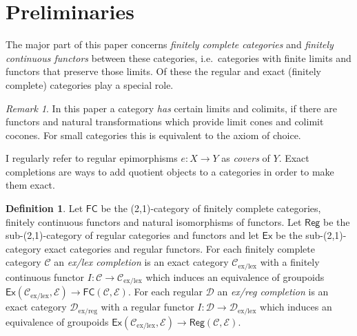 \documentclass[sort&compress]{elsarticle}
\theoremstyle{plain}
\theoremstyle{definition}
\newtheorem{defin}[theorem]{Definition}
\theoremstyle{remark}
\newtheorem{remark}[theorem]{Remark}
\newcommand\hide[1]{}
\newcommand\cat\mathcal
\newcommand\exlex{_\mathrm{ex/lex}}
\newcommand\exreg{_\mathrm{ex/reg}}
\begin{document}
\hide{%
\hide{Hyland, Pitts, Frey}
My paper stays within the sandbox of finitely complete categories, but exact completions are defined for categories which are finitely complete in a weakened sense . Moreover, Michael Shulman shows that both the ex/lex and the ex/reg completion are special cases of the exact completion of a \emph{unary site} in \citet{ECnSS}, which in turn is a member of a family of colimit completion construction for sites which includes the topos of sheaves. There is much to explore here concerning completions which are toposes.

Finally, the ex/lex completion of a category has some parallels to the construction of the category of Kan complexes in the same category. In this analogy the generic monomorphism is a generic small Kan fibration. Interesting \emph{$\infty$-toposes} and other models of \emph{homotopy type theory} may arise this way.
}

\section{Preliminaries} %
The major part of this paper concerns \emph{finitely complete categories} and \emph{finitely continuous functors} between these categories, i.e.\ categories with finite limits and functors that preserve those limits. Of these the regular and exact (finitely complete) categories play a special role.

\begin{remark} In this paper a category \emph{has} certain limits and colimits, if there are functors and natural transformations which provide limit cones and colimit cocones. For small categories this is equivalent to the axiom of choice. \end{remark}

I regularly refer to regular epimorphisms $e:X\to Y$ as \emph{covers} of $Y$.
Exact completions are ways to add quotient objects to a categories in order to make them exact.

\newcommand\FC{\mathsf{FC}}
\newcommand\Reg{\mathsf{Reg}}
\newcommand\Ex{\mathsf{Ex}}
\begin{defin}
Let $\FC$ be the (2,1)-category of finitely complete categories, finitely continuous functors and natural isomorphisms of functors. Let $\Reg$ be the sub-(2,1)-category of regular categories and functors and let $\Ex$ be the sub-(2,1)-category exact categories and regular functors. For each finitely complete category $\cat C$ an \emph{ex/lex completion} is an exact category $\cat C\exlex$ with a finitely continuous functor $I:\cat C \to \cat C\exlex$ which induces an equivalence of groupoids $\Ex(\cat C\exlex,\cat E) \to \FC(\cat C,\cat E)$. For each regular $\cat D$ an \emph{ex/reg completion} is an exact category $\cat D\exreg$ with a regular functor $I:\cat D \to \cat D\exlex$ which induces an equivalence of groupoids $\Ex(\cat C\exlex,\cat E) \to \Reg(\cat C,\cat E)$.
\end{defin}
\end{document}
